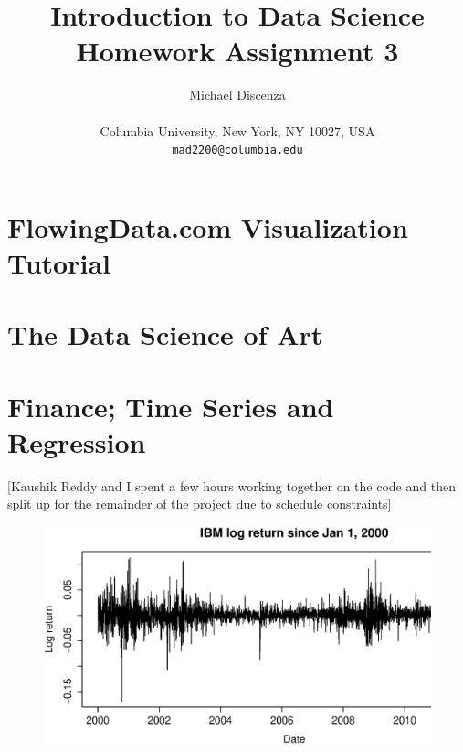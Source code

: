 \documentclass{article}
\title{Introduction to Data Science\\Homework Assignment 3}
\author{
Michael Discenza\\\\
Columbia University, New York, NY 10027, USA \\
\texttt{mad2200@columbia.edu}
}
\begin{document}
\maketitle




\section{FlowingData.com Visualization Tutorial}

\section{The Data Science of Art}


\section{Finance; Time Series and Regression}
[Kaushik Reddy and I spent a few hours working together on the code and then split up for the remainder of the project due to schedule constraints]

\begin{figure}[H]
\begin{center}
\includegraphics[width=1\columnwidth]{IBM_log_return.eps}
\caption{}
\end{center}
\end{figure}
\end{document}
